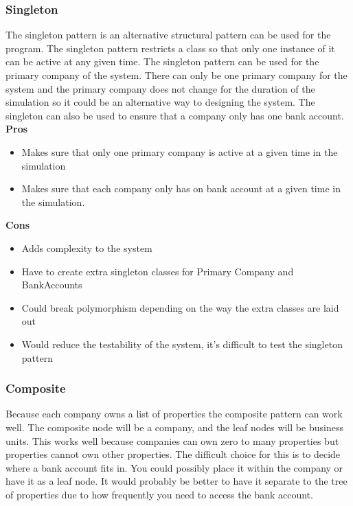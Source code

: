 \documentclass{article}
\begin{document}
\subsubsection*{Singleton}

The singleton pattern is an alternative structural pattern can be used for the program. The singleton pattern restricts a class so that only one instance of it can be active at any given time. The singleton pattern can be used for the primary company of the system. There can only be one primary company for the system and the primary company does not change for the duration of the simulation so it could be an alternative way to designing the system. The singleton can also be used to ensure that a company only has one bank account.\\

\noindent
\textbf{Pros}
\begin{itemize}
    \item Makes sure that only one primary company is active at a given time in the simulation
    \item Makes sure that each company only has on bank account at a given time in the simulation.
\end{itemize}
\textbf{Cons}
\begin{itemize}
    \item Adds complexity to the system
    \item Have to create extra singleton classes for Primary Company and BankAccounts
    \item Could break polymorphism depending on the way the extra classes are laid out
    \item Would reduce the testability of the system, it's difficult to test the singleton pattern
\end{itemize}

\subsubsection*{Composite}

Because each company owns a list of properties the composite pattern can work well. The composite node will be a company, and the leaf nodes will be business units. This works well because companies can own zero to many properties but properties cannot own other properties. The difficult choice for this is to decide where a bank account fits in. You could possibly place it within the company or have it as a leaf node. It would probably be better to have it separate to the tree of properties due to how frequently you need to access the bank account.\\
\end{document}
